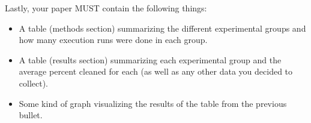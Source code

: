 \documentclass[paper=a4, fontsize=11pt, parskip=full]{scrartcl} %
\numberwithin{equation}{section} %
\numberwithin{figure}{section} %
\numberwithin{table}{section} %
\begin{document}
Lastly, your paper MUST contain the following things:

\begin{itemize}
	\item A table (methods section) summarizing the different experimental groups and how many execution runs were done in each group.
	\item A table (results section) summarizing each experimental group and the average percent cleaned for each (as well as any other data you decided to collect).
	\item Some kind of graph visualizing the results of the table from the previous bullet.
\end{itemize}


\end{document}
